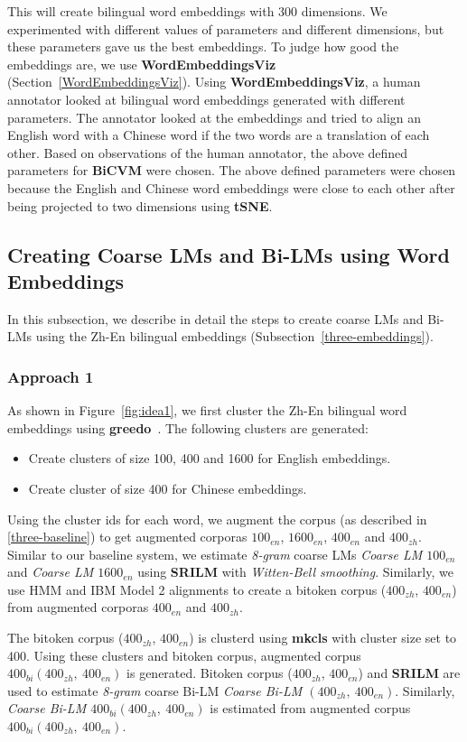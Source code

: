 This will create bilingual word embeddings with 300 dimensions. We experimented with different values of parameters and different dimensions, but these parameters gave us the best embeddings. To judge how good the embeddings are, we use \textbf{WordEmbeddingsViz} (Section~\ref{WordEmbeddingsViz}). Using \textbf{WordEmbeddingsViz}, a human annotator looked at bilingual word embeddings generated with different parameters. The annotator looked at the embeddings and tried to align an English word with a Chinese word if the two words are a translation of each other. Based on observations of the human annotator, the above defined parameters for \textbf{BiCVM} were chosen. The above defined parameters were chosen because the English and Chinese word embeddings were close to each other after being projected to two dimensions using \textbf{tSNE}.

\subsection{Creating Coarse LMs and Bi-LMs using Word Embeddings}
In this subsection, we describe in detail the steps to create coarse LMs and Bi-LMs using the Zh-En bilingual embeddings (Subsection~\ref{three-embeddings}).

\subsubsection{Approach 1}
As shown in Figure~\ref{fig:idea1}, we first cluster the Zh-En bilingual word embeddings using \textbf{greedo}~\cite{Stratos2014}. The following clusters are generated:
\begin{itemize}
	\item Create clusters of size 100, 400 and 1600 for English embeddings.
	\item Create cluster of size 400 for Chinese embeddings.
\end{itemize}
Using the cluster ids for each word, we augment the corpus (as described in \ref{three-baseline}) to get augmented corporas $100_{en}$, $1600_{en}$, $400_{en}$ and $400_{zh}$. Similar to our baseline system, we estimate \textit{8-gram} coarse LMs \textit{Coarse LM $100_{en}$} and \textit{Coarse LM $1600_{en}$} using \textbf{SRILM} with \textit{Witten-Bell smoothing}. Similarly, we use HMM and IBM Model 2 alignments to create a bitoken corpus ($400_{zh}$, $400_{en}$) from augmented corporas $400_{en}$ and $400_{zh}$.

The bitoken corpus ($400_{zh}$, $400_{en}$) is clusterd using \textbf{mkcls} with cluster size set to 400. Using these clusters and bitoken corpus, augmented corpus $400_{bi}(400_{zh},\ 400_{en})$ is generated. Bitoken corpus ($400_{zh}$, $400_{en}$) and \textbf{SRILM} are used to estimate \textit{8-gram} coarse Bi-LM \textit{Coarse Bi-LM $(400_{zh},\ 400_{en})$}. Similarly, \textit{Coarse Bi-LM $400_{bi}(400_{zh},\ 400_{en})$} is estimated from augmented corpus $400_{bi}(400_{zh},\ 400_{en})$.

